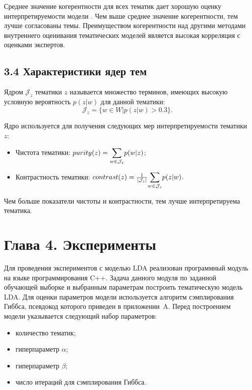 \documentclass[a4paper]{report}
\begin{document}
	Среднее значение когерентности для всех тематик дает хорошую оценку интерпретируемости модели \cite{bib:Newman}. Чем выше среднее значение когерентности, тем лучше согласованы темы. Преимуществом когерентности над другими методами внутреннего оценивания тематических моделей является высокая корреляция с оценками экспертов.
	
	
	\subsection{3.4 Характеристики ядер тем}
	
	
	Ядром $\mathcal{J}_z$ тематики $z$ называется множество терминов, имеющих высокую условную вероятность $p(z|w)$ для данной тематики:
	$$ \mathcal{J}_z = \{ w \in W | p(z|w) > 0.3 \}. $$
	
	Ядро используется для получения следующих мер интерпретируемости тематики $z$:
	\begin{itemize}
	\item{Чистота тематики: $purity(z) = \mathlarger \sum_{w \in \mathcal{J}_z} p(w|z)$};
	\item{Контрастность тематики: $ contrast (z) = \frac{1}{|\mathcal{J}_z|}
		\mathlarger \sum \limits_{w \in \mathcal{J}_z} p(z|w)
	$}.
	\end{itemize}
	
	Чем больше показатели чистоты и контрастности, тем лучше интерпретируема тематика.
	
	
	\section{Глава 4. Эксперименты}
	
	Для проведения экспериментов с моделью LDA реализован программный модуль на языке программирования C++. Задача данного модуля по заданной обучающей выборке и выбранным параметрам построить тематическую модель LDA. Для оценки параметров модели используется алгоритм сэмплирования Гиббса, псевдокод которого приведен в приложении~A. 
	Перед построением модели указывается следующий набор параметров:
	\begin{itemize}
		\item{количество тематик;     }
		\item{гиперпараметр $\alpha$; }
		\item{гиперпараметр $\beta$;  }
		\item{число итераций для сэмплирования Гиббса.	  }
	\end{itemize}
	
\end{document}

